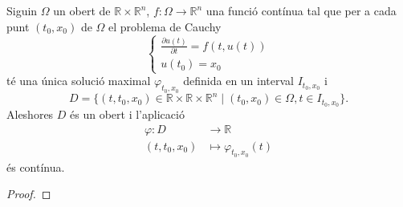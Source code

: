 \documentclass[../Apunts.tex]{subfiles}
\begin{document}
	\begin{theorem}
		\label{thm:continuitat respecte les condicions inicials}
		Siguin \(\Omega\) un obert de \(\mathbb{R}\times\mathbb{R}^{n}\), \(f\colon\Omega\longrightarrow\mathbb{R}^{n}\) una funció contínua tal que per a cada punt \((t_{0},x_{0})\) de \(\Omega\) el problema de Cauchy
		\[\begin{cases}
			\frac{\partial u(t)}{\partial t}=f(t,u(t)) \\
			u(t_{0})=x_{0}
		\end{cases}\]
		té una única solució maximal \(\varphi_{t_{0},x_{0}}\) definida en un interval \(I_{t_{0},x_{0}}\) i
		\[D=\{(t,t_{0},x_{0})\in\mathbb{R}\times\mathbb{R}\times\mathbb{R}^{n}\mid(t_{0},x_{0})\in\Omega,t\in I_{t_{0},x_{0}}\}.\]
		Aleshores \(D\) és un obert i l'aplicació
		\begin{align*}
			\varphi\colon D&\longrightarrow\mathbb{R} \\
			(t,t_{0},x_{0})&\longmapsto\varphi_{t_{0},x_{0}}(t)
		\end{align*}
		és contínua.
		\begin{proof}
		\end{proof}
	\end{theorem}
	
	
	
	
	
\end{document}
